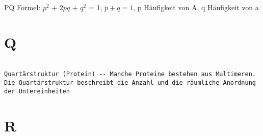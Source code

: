 \documentclass{article}
\begin{document}
PQ Formel: $p^{2}$ + $2pq$ + $q^2$ = 1, $p + q = 1$, p Häufigkeit von A, q Häufigkeit von a 

\newpage


\section{Q}
\begin{verbatim}

Quartärstruktur (Protein) -- Manche Proteine bestehen aus Multimeren. Die Quartärstruktur beschreibt die Anzahl und die räumliche Anordnung der Untereinheiten

\end{verbatim}
\newpage


\section{R}
\end{document}
